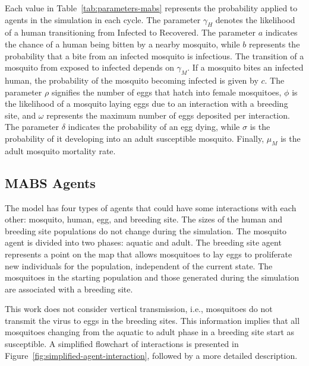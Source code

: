 Each value in Table~\ref{tab:parameters-mabs} represents the probability applied
to agents in the simulation in each cycle. The parameter $\gamma_H$ denotes the
likelihood of a human transitioning from Infected to Recovered. The parameter
$a$ indicates the chance of a human being bitten by a nearby mosquito, while $b$
represents the probability that a bite from an infected mosquito is infectious.
The transition of a mosquito from exposed to infected depends on $\gamma_M$. If
a mosquito bites an infected human, the probability of the mosquito becoming
infected is given by $c$. The parameter $\rho$ signifies the number of eggs that
hatch into female mosquitoes, $\phi$ is the likelihood of a mosquito laying eggs
due to an interaction with a breeding site, and $\omega$ represents the maximum
number of eggs deposited per interaction. The parameter $\delta$ indicates the
probability of an egg dying, while $\sigma$ is the probability of it developing
into an adult susceptible mosquito. Finally, $\mu_M$ is the adult mosquito
mortality rate.

\subsection{MABS Agents} \label{sec:agents}

The model has four types of agents that could have some interactions with each
other: mosquito, human, egg, and breeding site. The sizes of the human and
breeding site populations do not change during the simulation. The mosquito
agent is divided into two phases: aquatic and adult. The breeding site agent
represents a point on the map that allows mosquitoes to lay eggs to proliferate
new individuals for the population, independent of the current state. The
mosquitoes in the starting population and those generated during the simulation
are associated with a breeding site.

This work does not consider vertical transmission, i.e., mosquitoes do not
transmit the virus to eggs in the breeding sites. This information implies that
all mosquitoes changing from the aquatic to adult phase in a breeding site start
as susceptible. A simplified flowchart of interactions is presented in
Figure~\ref{fig:simplified-agent-interaction}, followed by a more detailed
description.

